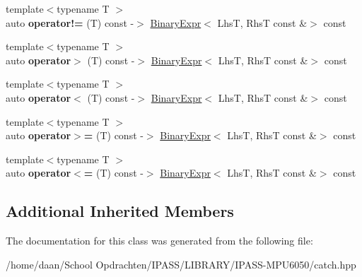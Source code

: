 \begin{DoxyCompactItemize}
{\footnotesize template$<$typename T $>$ }\\auto {\bfseries operator!=} (T) const -\/$>$ \hyperlink{classCatch_1_1BinaryExpr}{Binary\+Expr}$<$ LhsT, RhsT const \&$>$ const
\item 
\mbox{\label{classCatch_1_1BinaryExpr_a70b66bfaa6df6f8d04e243fda3e0e1e4}} 
{\footnotesize template$<$typename T $>$ }\\auto {\bfseries operator$>$} (T) const -\/$>$ \hyperlink{classCatch_1_1BinaryExpr}{Binary\+Expr}$<$ LhsT, RhsT const \&$>$ const
\item 
\mbox{\label{classCatch_1_1BinaryExpr_a8328cde75134e02d7d44c5277db96c09}} 
{\footnotesize template$<$typename T $>$ }\\auto {\bfseries operator$<$} (T) const -\/$>$ \hyperlink{classCatch_1_1BinaryExpr}{Binary\+Expr}$<$ LhsT, RhsT const \&$>$ const
\item 
\mbox{\label{classCatch_1_1BinaryExpr_a334b84ac38c19c7c961a6d974a6c7d73}} 
{\footnotesize template$<$typename T $>$ }\\auto {\bfseries operator$>$=} (T) const -\/$>$ \hyperlink{classCatch_1_1BinaryExpr}{Binary\+Expr}$<$ LhsT, RhsT const \&$>$ const
\item 
\mbox{\label{classCatch_1_1BinaryExpr_a8773a729df3a465cad4e270e912db436}} 
{\footnotesize template$<$typename T $>$ }\\auto {\bfseries operator$<$=} (T) const -\/$>$ \hyperlink{classCatch_1_1BinaryExpr}{Binary\+Expr}$<$ LhsT, RhsT const \&$>$ const
\end{DoxyCompactItemize}
\subsection*{Additional Inherited Members}


The documentation for this class was generated from the following file\+:\begin{DoxyCompactItemize}
\item 
/home/daan/\+School Opdrachten/\+I\+P\+A\+S\+S/\+L\+I\+B\+R\+A\+R\+Y/\+I\+P\+A\+S\+S-\/\+M\+P\+U6050/catch.\+hpp\end{DoxyCompactItemize}
